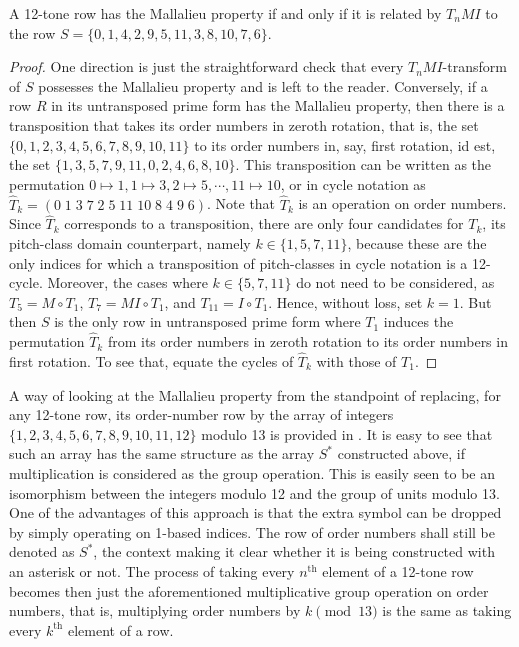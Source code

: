 \begin{proposition}
	\cite[17]{Morris1976}
	\label{morris-mallalieu}
	A 12-tone row has the Mallalieu property if and only if it is related by $T_nMI$ to the row $S = \{ 0, 1, 4, 2, 9, 5, 11, 3, 8, 10, 7, 6 \}$.
	\begin{proof}
		One direction is just the straightforward check that every $T_nMI$-transform of $S$ possesses the Mallalieu property and is left to the reader. Conversely, if a row $R$ in its untransposed prime form has the Mallalieu property, then there is a transposition that takes its order numbers in zeroth rotation, that is, the set $\{ 0, 1, 2, 3, 4, 5, 6, 7, 8, 9, 10, 11 \}$ to its order numbers in, say, first rotation, id est, the set $\{ 1, 3, 5, 7, 9, 11, 0, 2, 4, 6, 8, 10 \}$. This transposition can be written as the permutation $0 \mapsto 1, 1 \mapsto 3, 2 \mapsto 5, \cdots, 11 \mapsto 10 $, or in cycle notation as $\hat{T}_k = ( 0 \; 1 \; 3 \; 7 \; 2 \; 5 \; 11 \; 10 \; 8 \; 4 \; 9 \; 6 )$. Note that $\hat{T}_k$ is an operation on order numbers. Since $\hat{T}_k$ corresponds to a transposition, there are only four candidates for $T_k$, its pitch-class domain counterpart, namely $k \in \{ 1, 5, 7, 11 \}$, because these are the only indices for which a transposition of pitch-classes in cycle notation is a 12-cycle. Moreover, the cases where $k \in \{5, 7, 11\}$ do not need to be considered, as $T_5 = M \circ T_1$, $T_7 = M I \circ T_1$, and $T_{11} = I \circ T_1$. Hence, without loss, set $k = 1$. But then $S$ is the only row in untransposed prime form where $T_1$ induces the permutation $\hat{T}_k$ from its order numbers in zeroth rotation to its order numbers in first rotation. To see that, equate the cycles of $\hat{T}_k$ with those of $T_1$.
	\end{proof}
\end{proposition}

A way of looking at the Mallalieu property from the standpoint of replacing, for any 12-tone row, its order-number row by the array of integers $\{ 1, 2, 3, 4, 5, 6, 7, 8, 9, 10, 11, 12 \}$ modulo 13 is provided in \cite[278]{Lewin1966}. It is easy to see that such an array has the same structure as the array $S^*$ constructed above, if multiplication is considered as the group operation. This is easily seen to be an isomorphism between the integers modulo 12 and the group of units modulo 13. One of the advantages of this approach is that the extra symbol can be dropped by simply operating on 1-based indices. The row of order numbers shall still be denoted as $S^*$, the context making it clear whether it is being constructed with an asterisk or not. The process of taking every $n^\text{th}$ element of a 12-tone row becomes then just the aforementioned multiplicative group operation on order numbers, that is, multiplying order numbers by $k \pmod{13}$ is the same as taking every $k^\text{th}$ element of a row.

